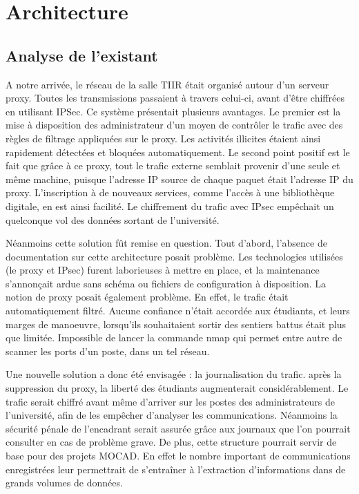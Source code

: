 \chapter{Architecture}
\label{chap:Architecture}

\section{Analyse de l'existant}

A notre arrivée, le réseau de la salle TIIR était organisé autour d'un serveur proxy. Toutes les transmissions passaient à travers celui-ci, avant d'être chiffrées en utilisant IPSec. 
Ce système présentait plusieurs avantages. Le premier est la mise à disposition des administrateur d'un moyen de contrôler le trafic avec des règles de filtrage appliquées sur le proxy. Les activités illicites étaient ainsi rapidement détectées et bloquées automatiquement. Le second point positif est le fait que grâce à ce proxy, tout le trafic externe semblait provenir d'une seule et même machine, puisque l'adresse IP source de chaque paquet était l'adresse IP du proxy. L'inscription à de nouveaux services, comme l'accès à une bibliothèque digitale, en est ainsi facilité. Le chiffrement du trafic avec IPsec empêchait un quelconque vol des données sortant de l'université.

Néanmoins cette solution fût remise en question. Tout d'abord, l'absence de documentation sur cette architecture posait problème. Les technologies utilisées (le proxy et IPsec) furent laborieuses à mettre en place, et la maintenance s'annonçait ardue sans schéma ou fichiers de configuration à disposition. La notion de proxy posait également problème. En effet, le trafic était automatiquement filtré. Aucune confiance n'était accordée aux étudiants, et leurs marges de manoeuvre, lorsqu'ils souhaitaient sortir des sentiers battus était plus que limitée. Impossible de lancer la commande nmap qui permet entre autre de scanner les ports d'un poste, dans un tel réseau.

Une nouvelle solution a donc été envisagée : la journalisation du trafic. après la suppression du proxy, la liberté des étudiants augmenterait considérablement. Le trafic serait chiffré avant même d'arriver sur les postes des administrateurs de l'université, afin de les empêcher d'analyser les communications. Néanmoins la sécurité pénale de l'encadrant serait assurée grâce aux journaux que l'on pourrait consulter en cas de problème grave. De plus, cette structure pourrait servir de base pour des projets MOCAD. En effet le nombre important de communications enregistrées leur permettrait de s'entraîner à l'extraction d'informations dans de grands volumes de données.


